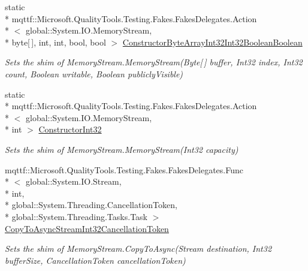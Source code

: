 \begin{DoxyCompactItemize}
static \\*
mqttf\-::\-Microsoft.\-Quality\-Tools.\-Testing.\-Fakes.\-Fakes\-Delegates.\-Action\\*
$<$ global\-::\-System.\-I\-O.\-Memory\-Stream, \\*
byte\mbox{[}$\,$\mbox{]}, int, int, bool, bool $>$ \hyperlink{class_system_1_1_i_o_1_1_fakes_1_1_shim_memory_stream_a04d370ecb5495014d2cd3d6afe568572}{Constructor\-Byte\-Array\-Int32\-Int32\-Boolean\-Boolean}
\begin{DoxyCompactList}\small\item\em Sets the shim of Memory\-Stream.\-Memory\-Stream(\-Byte\mbox{[}$\,$\mbox{]} buffer, Int32 index, Int32 count, Boolean writable, Boolean publicly\-Visible)\end{DoxyCompactList}\item 
static \\*
mqttf\-::\-Microsoft.\-Quality\-Tools.\-Testing.\-Fakes.\-Fakes\-Delegates.\-Action\\*
$<$ global\-::\-System.\-I\-O.\-Memory\-Stream, \\*
int $>$ \hyperlink{class_system_1_1_i_o_1_1_fakes_1_1_shim_memory_stream_a85eef910e223d1e31ccd3fbf6f85a042}{Constructor\-Int32}
\begin{DoxyCompactList}\small\item\em Sets the shim of Memory\-Stream.\-Memory\-Stream(\-Int32 capacity)\end{DoxyCompactList}\item 
mqttf\-::\-Microsoft.\-Quality\-Tools.\-Testing.\-Fakes.\-Fakes\-Delegates.\-Func\\*
$<$ global\-::\-System.\-I\-O.\-Stream, \\*
int, \\*
global\-::\-System.\-Threading.\-Cancellation\-Token, \\*
global\-::\-System.\-Threading.\-Tasks.\-Task $>$ \hyperlink{class_system_1_1_i_o_1_1_fakes_1_1_shim_memory_stream_afd2e41ba42df56a4e2747ec0ea19edd2}{Copy\-To\-Async\-Stream\-Int32\-Cancellation\-Token}
\begin{DoxyCompactList}\small\item\em Sets the shim of Memory\-Stream.\-Copy\-To\-Async(\-Stream destination, Int32 buffer\-Size, Cancellation\-Token cancellation\-Token)\end{DoxyCompactList}\item 

\end{DoxyCompactItemize}

